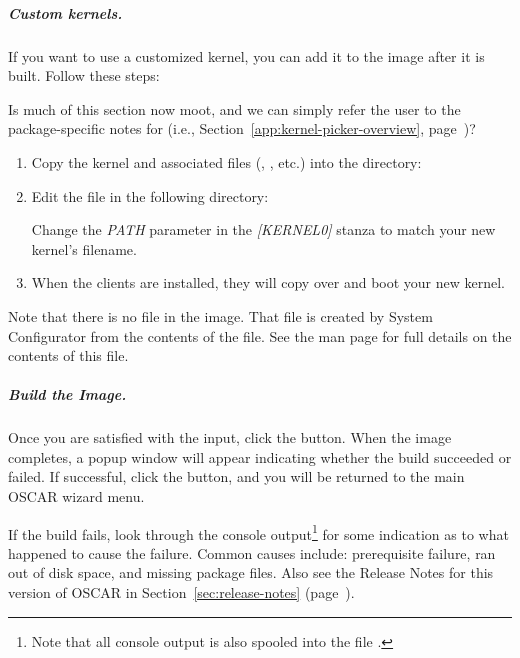 \subparagraph{Custom kernels.}

If you want to use a customized kernel, you can add it to the image
after it is built. Follow these steps:

\begin{discuss}
  Is much of this section now moot, and we can simply refer the user
  to the package-specific notes for  (i.e.,
  Section~\ref{app:kernel-picker-overview},
  page~\pageref{app:kernel-picker-overview})?
\end{discuss}

\begin{enumerate}
\item Copy the kernel and associated files (,
  , etc.) into the directory:

  \vspace{11pt}
  \centerline{}

\item Edit the  file in the following
  directory:

  \vspace{11pt}
  \centerline{}
  \vspace{11pt}
  
  Change the \emph{PATH} parameter in the \emph{[KERNEL0]} stanza to
  match your new kernel's filename.

\item When the clients are installed, they will copy over and boot
  your new kernel.
\end{enumerate}

Note that there is no  file in the image. That file is
created by System Configurator from the contents of the
 file. See the 
man page for full details on the contents of this file.

\subparagraph{Build the Image.}

Once you are satisfied with the input, click the 
button.  When the image completes, a popup window will appear
indicating whether the build succeeded or failed.  If successful,
click the  button, and you will be returned to the main
OSCAR wizard menu.

If the build fails, look through the console output\footnote{Note that
  all console output is also spooled into the file
  .} for some indication as to what happened to
cause the failure.  Common causes include: prerequisite failure, ran
out of disk space, and missing package files.  Also see the Release
Notes for this version of OSCAR in Section~\ref{sec:release-notes}
(page~\pageref{sec:release-notes}).


